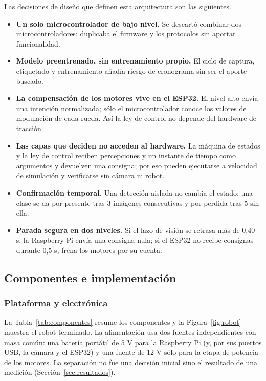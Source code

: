 \documentclass[pdflatex,sn-mathphys-num]{sn-jnl}
\begin{document}
Las decisiones de dise\~no que definen esta arquitectura son las siguientes.

\begin{itemize}
  \item \textbf{Un solo microcontrolador de bajo nivel.} Se descart\'o
        combinar dos microcontroladores: duplicaba el firmware y los
        protocolos sin aportar funcionalidad.
  \item \textbf{Modelo preentrenado, sin entrenamiento propio.} El ciclo de
        captura, etiquetado y entrenamiento a\~nad\'ia riesgo de cronograma sin
        ser el aporte buscado.
  \item \textbf{La compensaci\'on de los motores vive en el ESP32.} El nivel
        alto env\'ia una intenci\'on normalizada; s\'olo el microcontrolador
        conoce los valores de modulaci\'on de cada rueda. As\'i la ley de
        control no depende del hardware de tracci\'on.
  \item \textbf{Las capas que deciden no acceden al hardware.} La m\'aquina de
        estados y la ley de control reciben percepciones y un instante de
        tiempo como argumentos y devuelven una consigna; por eso pueden
        ejecutarse a velocidad de simulaci\'on y verificarse sin c\'amara ni
        robot.
  \item \textbf{Confirmaci\'on temporal.} Una detecci\'on aislada no cambia el
        estado: una clase se da por presente tras 3 im\'agenes consecutivas y
        por perdida tras 5 sin ella.
  \item \textbf{Parada segura en dos niveles.} Si el lazo de visi\'on se
        retrasa m\'as de 0,40 s, la Raspberry Pi env\'ia una consigna nula; si el
        ESP32 no recibe consignas durante 0,5 s, frena los motores por su
        cuenta.
\end{itemize}

\subsection{Componentes e implementaci\'on}

\subsubsection{Plataforma y electr\'onica}

La Tabla~\ref{tab:componentes} resume los componentes y la
Figura~\ref{fig:robot} muestra el robot terminado. La alimentaci\'on usa dos
fuentes independientes con masa com\'un: una bater\'ia port\'atil de 5 V para
la Raspberry Pi (y, por sus puertos USB, la c\'amara y el ESP32) y una fuente
de 12 V s\'olo para la etapa de potencia de los motores. La separaci\'on no fue
una decisi\'on inicial sino el resultado de una medici\'on
(Secci\'on~\ref{sec:resultados}).
\end{document}
